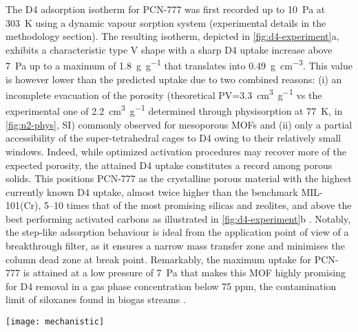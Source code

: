 The D4 adsorption isotherm for PCN-777 was first recorded up to \SI{10}{\pascal}
at \SI{303}{\kelvin} using a dynamic vapour sorption system (experimental
details in the methodology section). The resulting isotherm, depicted in
\cref{fig:d4-experiment}a, exhibits a characteristic type V shape
\citep{thommesPhysisorptionGasesSpecial2015} with a sharp D4 uptake increase
above \SI{7}{\pascal} up to a maximum of \SI{1.8}{\gram\per\gram} that
translates into \SI{0.49}{\gram\per\centi\metre\cubed}. This value is however
lower than the predicted uptake due to two combined reasons: (i) an incomplete
evacuation of the porosity (theoretical PV=\SI{3.3}{\centi\metre\cubed\per\gram}
vs the experimental one of \SI{2.2}{\centi\metre\cubed\per\gram} determined
through  physisorption at \SI{77}{\kelvin}, in \cref{fig:n2-phys}, SI)
commonly observed for mesoporous MOFs
\citep{nelsonSupercriticalProcessingRoute2009, parkCrystalStructureGuest2007}
and (ii) only a partial accessibility of the super-tetrahedral cages to D4 owing
to their relatively small windows. Indeed, while optimized activation procedures
may recover more of the expected porosity, the attained D4 uptake constitutes a
record among porous solids. This positions PCN-777 as the crystalline porous
material with the highest currently known D4 uptake, almost twice higher than
the benchmark MIL-101(Cr), 5--10 times that of the most promising silicas and
zeolites, and above the best performing activated carbons as illustrated in
\cref{fig:d4-experiment}b \citep{wangRecentAdvancesTechnologies2019}. Notably,
the step-like adsorption behaviour is ideal from the application point of view
of a breakthrough filter, as it ensures a narrow mass transfer zone and
minimises the column dead zone at break point. Remarkably, the maximum uptake
for PCN-777 is attained at a low pressure of \SI{7}{\pascal} that makes this MOF
highly promising for D4 removal in a gas phase concentration below 75 ppm, the
contamination limit of siloxanes found in biogas streams
\citep{ohannessianVolatileOrganicSilicon2008,
wangRecentAdvancesTechnologies2019, dewilEnergyUseBiogas2006}.

\begin{widefigure}[htb]
    \centering
    \texttt{[image: mechanistic]}
    \caption{%
        Representative snapshots of the preferential sitting of D4 in the pores
        of PCN-777 at \SI{298}{\kelvin} for increasing loading at (a) 10\% with
        highlighted interactions distance between D4 and the MOF framework, and
        at (b) 40\%, (c) 65\%, and (d) 100\% fractional loading (\(\theta\)).
        Framework atoms (sticks) and D4 molecules (lines, and ball and sticks)
        are coded as Zr, N, O, Si, C, and H atoms in light blue, dark blue, red,
        yellow, dark grey, and light grey respectively. The separating distance
        is represented by dashed black lines and reported in Å.
    }\label{fig:d4-mechanistic}
\end{widefigure}

